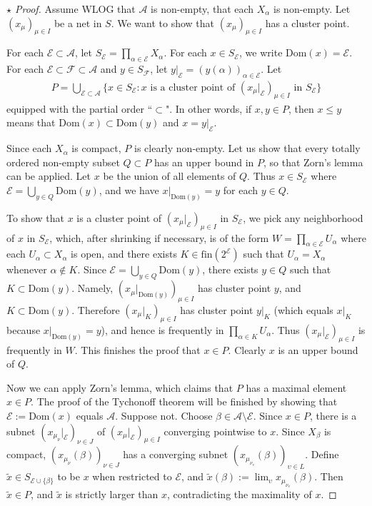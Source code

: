 \documentclass[12pt,b5paper,notitlepage]{article}
\theoremstyle{definition}
\theoremstyle{plain}
\newcommand{\wtd}{\widetilde}
\newcommand{\Domain}{\mathrm{Dom}}
\newcommand{\scr}{\mathscr}
\newcommand{\fin}{\mathrm{fin}}
\numberwithin{equation}{section}
\begin{document}
\begin{proof}[$\star$ Proof]
Assume WLOG that $\scr A$ is non-empty, that each $X_\alpha$ is non-empty. Let $(x_\mu)_{\mu\in I}$ be a net in $S$. We want to show that $(x_\mu)_{\mu\in I}$ has a cluster point.

For each $\scr E\subset\scr A$, let $S_{\scr E}=\prod_{\alpha\in\scr E}X_\alpha$. For each $x\in S_{\scr E}$, we write $\Domain(x)=\scr E$.  For each $\scr E\subset\scr F\subset\scr A$ and $y\in S_{\scr F}$, let $y|_{\scr E}=(y(\alpha))_{\alpha\in\scr E}$. Let
\begin{align*}
P=\bigcup_{\scr E\subset\scr A}\big\{x\in S_{\scr E}:x\text{ is a cluster point of $(x_\mu|_{\scr E})_{\mu\in I}$ in $S_{\scr E}$} \big\}
\end{align*} 
equipped with the partial order ``$\subset$". In other words, if $x,y\in P$, then $x\leq y$ means that $\Domain(x)\subset\Domain(y)$ and $x=y|_{\scr E}$.

Since each $X_\alpha$ is compact, $P$ is clearly non-empty. Let us show that every totally ordered non-empty subset $Q\subset P$ has an upper bound in $P$, so that Zorn's lemma can be applied. Let $x$ be the union of all elements of $Q$. Thus $x\in S_{\scr E}$ where $\scr E=\bigcup_{y\in Q}\Domain(y)$, and we have $x|_{\Domain(y)}=y$ for each $y\in Q$. 

To show that $x$ is a cluster point of $(x_\mu|_{\scr E})_{\mu\in I}$ in $S_{\scr E}$, we pick any neighborhood of $x$ in $S_{\scr E}$, which, after shrinking if necessary, is of the form $W=\prod_{\alpha\in\scr E}U_\alpha$ where each $U_\alpha\subset X_\alpha$ is open, and there exists $K\in\fin(2^{\scr E})$ such that $U_\alpha=X_\alpha$ whenever $\alpha\notin K$. Since $\scr E=\bigcup_{y\in Q}\Domain(y)$, there exists $y\in Q$ such that $K\subset\Domain(y)$. Namely,   $(x_\mu|_{\Domain(y)})_{\mu\in I}$ has cluster point $y$, and $K\subset\Domain(y)$. Therefore $(x_\mu|_K)_{\mu\in I}$ has cluster point $y|_K$ (which equals $x|_K$ because $x|_{\Domain(y)}=y$), and hence is frequently in $\prod_{\alpha\in K}U_\alpha$. Thus $(x_\mu|_{\scr E})_{\mu\in I}$ is frequently in $W$. This finishes the proof that $x\in P$. Clearly $x$ is an upper bound of $Q$.

Now we can apply Zorn's lemma, which claims that $P$ has a maximal element $x\in P$. The proof of the Tychonoff theorem will be finished by showing that $\scr E:=\Domain(x)$ equals $\scr A$. Suppose not. Choose $\beta\in\scr A\setminus\scr E$. Since $x\in P$, there is a subnet $(x_{\mu_\nu}|_{\scr E})_{\nu\in J}$ of $(x_\mu|_{\scr E})_{\mu\in I}$ converging pointwise to $x$. Since $X_\beta$ is compact, $(x_{\mu_\nu}(\beta))_{\nu\in J}$ has a converging subnet $(x_{\mu_{\nu_\upsilon}}(\beta))_{\upsilon\in L}$. Define $\wtd x\in S_{\scr E\cup\{\beta\}}$ to be $x$ when restricted to $\scr E$, and $\wtd x(\beta):=\lim_\upsilon x_{\mu_{\nu_\upsilon}}(\beta)$. Then $\wtd x\in P$, and $\wtd x$ is strictly larger than $x$, contradicting the maximality of $x$.
\end{proof}
\end{document}
